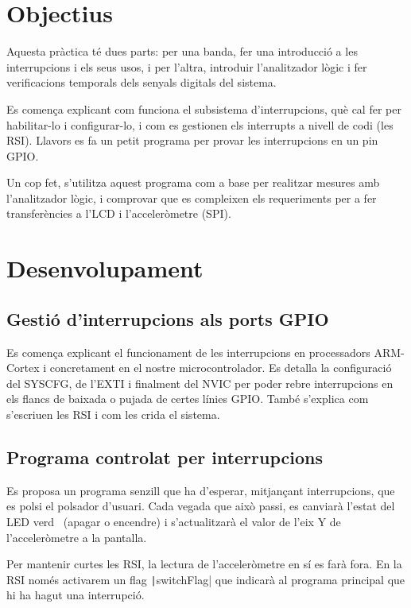 
\section{Objectius}

Aquesta pràctica té dues parts: per una banda, fer una introducció a les interrupcions
i els seus usos, i per l'altra, introduir l'analitzador lògic i fer verificacions
temporals dels senyals digitals del sistema.

Es comença explicant com funciona el subsistema d'interrupcions, què cal fer per
habilitar-lo i configurar-lo, i com es gestionen els interrupts a nivell de codi (les RSI).
Llavors es fa un petit programa per provar les interrupcions en un pin GPIO.

Un cop fet, s'utilitza aquest programa com a base per realitzar mesures amb l'analitzador
lògic, i comprovar que es compleixen els requeriments per a fer transferències a l'LCD
i l'acceleròmetre (SPI).

\section{Desenvolupament}


\subsection{Gestió d'interrupcions als ports GPIO}

Es comença explicant el funcionament de les interrupcions en processadors ARM-Cortex
i concretament en el nostre microcontrolador. Es detalla la configuració del SYSCFG,
de l'EXTI i finalment del NVIC per poder rebre interrupcions en els flancs de baixada
o pujada de certes línies GPIO. També s'explica com s'escriuen les RSI i com les
crida el sistema.


\subsection{Programa controlat per interrupcions}

Es proposa un programa senzill que ha d'esperar, mitjançant interrupcions, que es polsi
el polsador d'usuari. Cada vegada que això passi, es canviarà l'estat del LED verd~
(apagar o encendre) i s'actualitzarà el valor de l'eix Y de l'acceleròmetre a la pantalla.

Per mantenir curtes les RSI, la lectura de l'acceleròmetre en sí es farà fora.
En la RSI només activarem un flag \texttt|switchFlag| que indicarà al programa
principal que hi ha hagut una interrupció.

